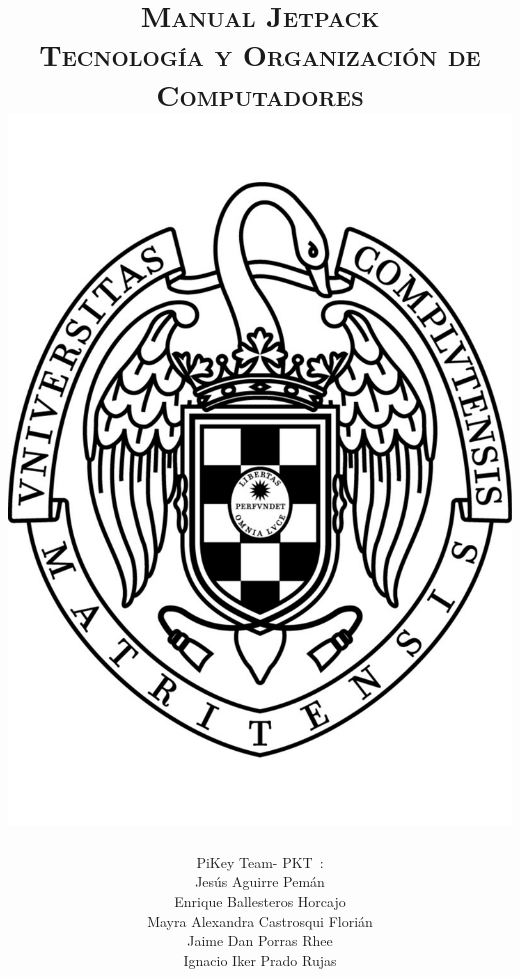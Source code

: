\documentclass[11pt, a4paper, spanish, openright, twoside]{book}
\newcommand*{\PKT}{\hbox{P}\kern-2.5pt\lower3.5pt\hbox{\small{K}}\kern-2.8pt\hbox{T}\kern-2pt}	%
\begin{document}
 
\title{\Huge{\textsc{Manual Jetpack}} \\
	\vspace{0.7cm}
	 \textsc{\Large{Tecnología y Organización de Computadores}} \\
	\includegraphics[scale=0.3]{ucm.pdf}}
\author{{\Large{PiKey Team-}} \PKT \ : \vspace{0.2cm} \\
	Jesús Aguirre Pemán \\
	 Enrique Ballesteros Horcajo \\
	 Mayra Alexandra Castrosqui Florián\\
	 Jaime Dan Porras Rhee \\
	 Ignacio Iker Prado Rujas}
\date{\Today}
\maketitle
\end{document}
